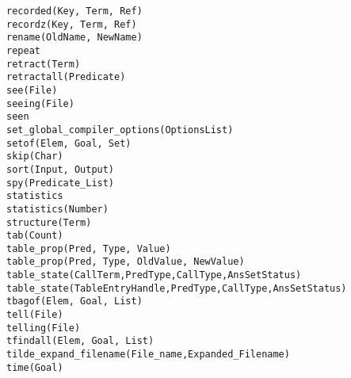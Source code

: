 \begin{tabbing}
 \> {\tt recorded(Key, Term, Ref)} \>					\\
 \> {\tt recordz(Key, Term, Ref)} \>					\\
 \> {\tt rename(OldName, NewName)} \>					\\
 \> {\tt repeat}		\>					\\
 \> {\tt retract(Term)}		\>					\\
 \> {\tt retractall(Predicate)}	\>					\\
 \> {\tt see(File)}		\>					\\
 \> {\tt seeing(File)}		\>					\\
 \> {\tt seen}			\>					\\
 \> {\tt set\_global\_compiler\_options(OptionsList)} \>		\\
 \> {\tt setof(Elem, Goal, Set)} \>					\\
 \> {\tt skip(Char)}		\>					\\
 \> {\tt sort(Input, Output)}	\>					\\
 \> {\tt spy(Predicate\_List)}	\>					\\
 \> {\tt statistics}		\>					\\
 \> {\tt statistics(Number)}	\>					\\
 \> {\tt structure(Term)}	\>					\\
 \> {\tt tab(Count)}		\>					\\
 \> {\tt table\_prop(Pred, Type, Value)} \>				\\
 \> {\tt table\_prop(Pred, Type, OldValue, NewValue)} \>		\\
 \> {\tt table\_state(CallTerm,PredType,CallType,AnsSetStatus)}	\>	\\
 \> {\tt table\_state(TableEntryHandle,PredType,CallType,AnsSetStatus)}	\> \\
 \> {\tt tbagof(Elem, Goal, List)} \>					\\
 \> {\tt tell(File)}		\>					\\
 \> {\tt telling(File)}		\>					\\
 \> {\tt tfindall(Elem, Goal, List)} \>					\\
 \> {\tt tilde\_expand\_filename(File\_name,Expanded\_Filename)} \>	\\
 \> {\tt time(Goal)} \>							\\

\end{tabbing}
